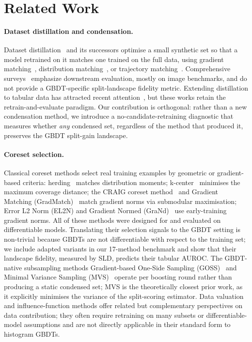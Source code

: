 
\section{Related Work}
\label{sec:related}

\paragraph{Dataset distillation and condensation.}
Dataset distillation~\cite{wang2018datasetdistillation} and its successors
optimise a small synthetic set so that a model retrained on it matches one
trained on the full data, using gradient matching~\cite{zhao2021dcgm},
distribution matching~\cite{zhao2023dm}, or trajectory
matching~\cite{cazenavette2022mtt}. Comprehensive surveys~\cite{lei2023survey,
yu2023review,sachdeva2023survey} emphasize downstream evaluation, mostly on
image benchmarks, and do not provide a GBDT-specific split-landscape fidelity
metric. Extending distillation to tabular data has
attracted recent
attention~\cite{kang2024tabdistill,kang2025tabdistill,herurkar2024tabdist,
medvedev2020tabular}, but these works retain the retrain-and-evaluate paradigm.
Our contribution is orthogonal: rather than a new condensation method, we
introduce a no-candidate-retraining diagnostic that measures whether \emph{any}
condensed set, regardless of the method that produced it, preserves the GBDT
split-gain landscape.

\paragraph{Coreset selection.}
Classical coreset methods select real training examples by geometric or
gradient-based criteria: herding~\cite{welling2009herding} matches
distribution moments; k-center~\cite{sener2018kcenter} minimises the maximum
coverage distance; the CRAIG coreset method~\cite{mirzasoleiman2020craig} and
Gradient Matching (GradMatch)~\cite{killamsetty2021gradmatch} match gradient
norms via submodular maximisation; Error L2 Norm (EL2N) and Gradient Normed
(GraNd)~\cite{paul2021el2n} use early-training gradient norms. All of these
methods were designed for and evaluated on differentiable
models. Translating their selection signals to the GBDT setting is non-trivial
because GBDTs are not differentiable with respect to the training set; we
include adapted variants in our 17-method benchmark and show that their
landscape fidelity, measured by SLD, predicts their tabular AUROC. The
GBDT-native subsampling methods Gradient-based One-Side Sampling
(GOSS)~\cite{ke2017lightgbm} and Minimal Variance Sampling
(MVS)~\cite{ibragimov2019mvs} operate per boosting round rather than producing
a static condensed set; MVS is the theoretically closest prior work, as it
explicitly minimises the variance of the split-scoring estimator. Data
valuation~\cite{ghorbani2019shapley,koh2017influence} and influence-function
methods offer related but complementary perspectives on data contribution; they
often require retraining on many subsets or differentiable-model assumptions
and are not directly applicable in their standard form to histogram GBDTs.

